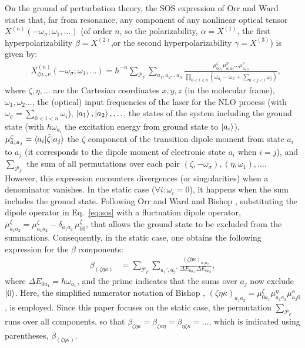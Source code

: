 \documentclass[USenglish]{article}
\begin{document}
On the ground of perturbation theory, 
the SOS expression of Orr and Ward \cite{orrPerturbationTheoryNonlinear1971} states that, far from resonance, any component of any nonlinear optical tensor $X^{(n)}(-\omega_\sigma;\omega_1,\ldots)$ (of order $n$, so the polarizability, $\alpha = X^{(1)}$, the first hyperpolarizability $\beta = X^{(2)}$,or the second hyperpolarizability $\gamma = X^{(3)}$) is given by:\begin{align}
	&X^{(n)}_{\zeta\eta\ldots\nu}(-\omega_\sigma;\omega_1,\ldots) = \hbar^{-n}\sum_{\mathcal{P}_F}\sum_{a_1,a_2\ldots\,a_{n}} \frac{\mu^\zeta_{0a_1}{\mu}^\eta_{a_1a_2}\ldots \mu^\nu_{a_{n\,0}}}{\prod_{0<i\leq n} (\omega_{a_i}-\omega_\sigma+\sum_{0<j<i} \omega_j)},\label{eq:sos}
\end{align}
where $\zeta,\eta,\ldots$ are the Cartesian coordinates $x, y, z$ (in the molecular frame), $\omega_1, \omega_2\ldots$, the (optical) input frequencies of the laser for the NLO process (with $\omega_\sigma = \sum_{0< i<n} \omega_i$), $\ket{a_1}, \ket{a_2}, \ldots$, the states of the system  including the ground state (with $\hbar\omega_{a_i}$ the excitation energy from ground state to $\ket{a_i}$), $\mu^\zeta_{a_ia_j} = \braket{a_i|\hat \zeta|a_j}$ the $\zeta$ component of the transition dipole moment from state $a_i$ to $a_j$ (it corresponds to the dipole moment of electronic state $a_i$ when $i=j$), and $\sum_{\mathcal{P}_F}$ the sum of all permutations over each pair $(\zeta, -\omega_\sigma),(\eta,\omega_1),\ldots$.  However, this expression encounters divergences (or singularities) when a denominator vanishes. In the static case ($\forall i: \omega_i = 0$), it happens when the sum includes the ground state. Following Orr and Ward \cite{orrPerturbationTheoryNonlinear1971} and Bishop \cite{bishopExplicitNondivergentFormulas1994}, substituting the dipole operator in Eq.~\eqref{eq:sos} with a fluctuation dipole operator, $\bar{\mu}^\zeta_{a_1 a_2} = \mu^\zeta_{a_1 a_2} - \delta_{a_1 a_2}\, \mu_{00}^\zeta$, that allows the ground state to be excluded from the summations. Consequently, in the static case, one obtains the following expression for the $\beta$ components:
\begin{align}
	\beta_{(\zeta\eta\kappa)} &=\sum_{\mathcal{P}_F} \sum_{a_1', a_2'} \frac{(\zeta\bar{\eta}\kappa)_{a_1 a_2}}{\Delta E_{0a_1}\,\Delta E_{0a_2}}, \label{eq:sosbeta}
\end{align}
where $\Delta E_{0a_1} = \hbar\omega_{a_1}$, and the prime indicates that the sums over $a_j$ now exclude $\ket{0}$.  Here, the simplified numerator notation of Bishop \cite{bishopExplicitNondivergentFormulas1994}, $(\zeta\eta\kappa)_{a_1 a_2} = \mu_{0 a_1}^\zeta \mu_{a_1 a_2}^\eta \mu_{a_2 0}^\kappa$, is employed. Since this paper focuses on the static case, the permutation $\sum_{\mathcal P_F}$ runs over all components, so that $\beta_{\zeta\eta\kappa} = \beta_{\zeta\kappa\eta} = \beta_{\eta\zeta\kappa} = \ldots$, which is indicated using parentheses, $\beta_{(\zeta\eta\kappa)}$.
\end{document}
